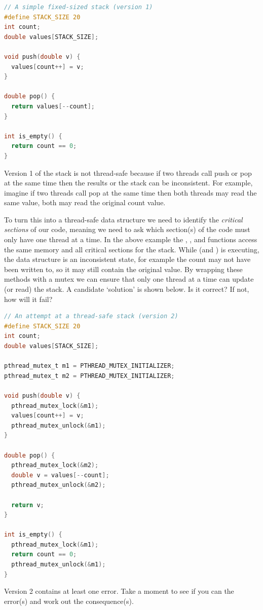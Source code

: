 \begin{lstlisting}[language=C]
// A simple fixed-sized stack (version 1)
#define STACK_SIZE 20
int count;
double values[STACK_SIZE];

void push(double v) {
  values[count++] = v;
}

double pop() {
  return values[--count];
}

int is_empty() {
  return count == 0;
}
\end{lstlisting}

Version 1 of the stack is not thread-safe because if two threads call push or pop at the same time then the results or the stack can be inconsistent.
For example, imagine if two threads call pop at the same time then both threads may read the same value, both may read the original count value.

To turn this into a thread-safe data structure we need to identify the \emph{critical sections} of our code, meaning we need to ask which section(s) of the code must only have one thread at a time.
In the above example the , , and  functions access the same memory and all critical sections for the stack.
While  (and ) is executing, the data structure is an inconsistent state, for example the count may not have been written to, so it may still contain the original value.
By wrapping these methods with a mutex we can ensure that only one thread at a time can update (or read) the stack.
A candidate `solution' is shown below.
Is it correct?
If not, how will it fail?

\begin{lstlisting}[language=C]
// An attempt at a thread-safe stack (version 2)
#define STACK_SIZE 20
int count;
double values[STACK_SIZE];

pthread_mutex_t m1 = PTHREAD_MUTEX_INITIALIZER;
pthread_mutex_t m2 = PTHREAD_MUTEX_INITIALIZER;

void push(double v) {
  pthread_mutex_lock(&m1);
  values[count++] = v;
  pthread_mutex_unlock(&m1);
}

double pop() {
  pthread_mutex_lock(&m2);
  double v = values[--count];
  pthread_mutex_unlock(&m2);

  return v;
}

int is_empty() {
  pthread_mutex_lock(&m1);
  return count == 0;
  pthread_mutex_unlock(&m1);
}
\end{lstlisting}

Version 2 contains at least one error.
Take a moment to see if you can the error(s) and work out the consequence(s).

